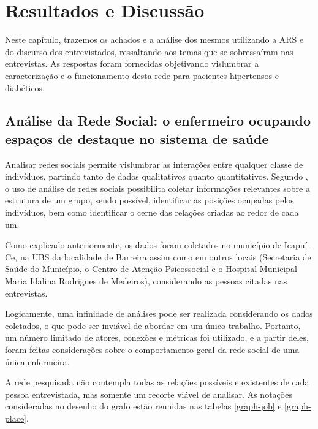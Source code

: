 \chapter{Resultados e Discussão}
\label{chap:resultados}

Neste capítulo, trazemos os achados e a análise dos mesmos utilizando a ARS e do discurso dos entrevistados, ressaltando aos temas que se sobressaíram nas entrevistas. As respostas foram fornecidas objetivando vislumbrar a caracterização e o funcionamento desta rede para pacientes hipertensos e diabéticos. 

\section{Análise da Rede Social: o enfermeiro ocupando espaços de destaque no sistema de saúde}

Analisar redes sociais permite vislumbrar as interações entre qualquer classe de indivíduos, partindo tanto de dados qualitativos quanto quantitativos. Segundo \cite{stanley1994social},  o uso de  análise de redes sociais possibilita coletar informações relevantes sobre a estrutura de um grupo, sendo possível, identificar as posições ocupadas pelos indivíduos, bem como identificar o cerne das relações criadas ao redor de cada um.

Como explicado anteriormente, os dados foram coletados no município de Icapuí-Ce, na \acrlong{UBS} da localidade de Barreira assim como em outros locais (Secretaria de Saúde do Município, o Centro de Atenção Psicossocial e o Hospital Municipal Maria Idalina Rodrigues de Medeiros), considerando as pessoas citadas nas entrevistas.

Logicamente, uma infinidade de análises pode ser realizada considerando os dados coletados, o que pode ser inviável de abordar em um único trabalho. Portanto, um número limitado de atores, conexões e métricas foi utilizado, e a partir deles, foram feitas considerações sobre o comportamento geral da rede social de uma única enfermeira. 

A rede pesquisada não contempla todas as relações possíveis e existentes de cada pessoa entrevistada, mas somente um recorte viável de analisar. As notações consideradas no desenho do grafo estão reunidas nas tabelas \ref{graph-job} e \ref{graph-place}.

